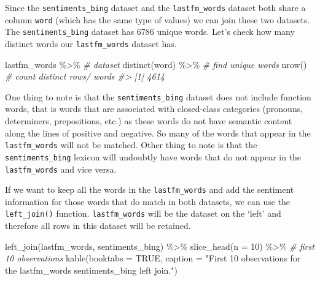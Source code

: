 \documentclass[
]{article}
\newenvironment{Shaded}{\begin{snugshade}}{\end{snugshade}}
\newcommand{\AttributeTok}[1]{\textcolor[rgb]{0.77,0.63,0.00}{#1}}
\newcommand{\CommentTok}[1]{\textcolor[rgb]{0.56,0.35,0.01}{\textit{#1}}}
\newcommand{\ConstantTok}[1]{\textcolor[rgb]{0.00,0.00,0.00}{#1}}
\newcommand{\DecValTok}[1]{\textcolor[rgb]{0.00,0.00,0.81}{#1}}
\newcommand{\FunctionTok}[1]{\textcolor[rgb]{0.00,0.00,0.00}{#1}}
\newcommand{\NormalTok}[1]{#1}
\newcommand{\SpecialCharTok}[1]{\textcolor[rgb]{0.00,0.00,0.00}{#1}}
\newcommand{\StringTok}[1]{\textcolor[rgb]{0.31,0.60,0.02}{#1}}
\begin{document}
Since the \texttt{sentiments\_bing} dataset and the \texttt{lastfm\_words} dataset both share a column \texttt{word} (which has the same type of values) we can join these two datasets. The \texttt{sentiments\_bing} dataset has 6786 unique words. Let's check how many distinct words our \texttt{lastfm\_words} dataset has.

\begin{Shaded}
\begin{Highlighting}[]
\NormalTok{lastfm\_words }\SpecialCharTok{\%\textgreater{}\%} \CommentTok{\# dataset}
  \FunctionTok{distinct}\NormalTok{(word) }\SpecialCharTok{\%\textgreater{}\%} \CommentTok{\# find unique words}
  \FunctionTok{nrow}\NormalTok{() }\CommentTok{\# count distinct rows/ words}
\CommentTok{\#\textgreater{} [1] 4614}
\end{Highlighting}
\end{Shaded}

One thing to note is that the \texttt{sentiments\_bing} dataset does not include function words, that is words that are associated with closed-class categories (pronouns, determiners, prepositions, etc.) as these words do not have semantic content along the lines of positive and negative. So many of the words that appear in the \texttt{lastfm\_words} will not be matched. Other thing to note is that the \texttt{sentiments\_bing} lexicon will undoubtly have words that do not appear in the \texttt{lastfm\_words} and vice versa.

If we want to keep all the words in the \texttt{lastfm\_words} and add the sentiment information for those words that do match in both datasets, we can use the \texttt{left\_join()} function. \texttt{lastfm\_words} will be the dataset on the `left' and therefore all rows in this dataset will be retained.

\begin{Shaded}
\begin{Highlighting}[]
\FunctionTok{left\_join}\NormalTok{(lastfm\_words, sentiments\_bing) }\SpecialCharTok{\%\textgreater{}\%} 
  \FunctionTok{slice\_head}\NormalTok{(}\AttributeTok{n =} \DecValTok{10}\NormalTok{) }\SpecialCharTok{\%\textgreater{}\%} \CommentTok{\# first 10 observations}
  \FunctionTok{kable}\NormalTok{(}\AttributeTok{booktabs =} \ConstantTok{TRUE}\NormalTok{,}
        \AttributeTok{caption =} \StringTok{"First 10 observations for the \textasciigrave{}lastfm\_words\textasciigrave{} sentiments\_bing\textasciigrave{} left join."}\NormalTok{)}
\end{Highlighting}
\end{Shaded}
\end{document}

